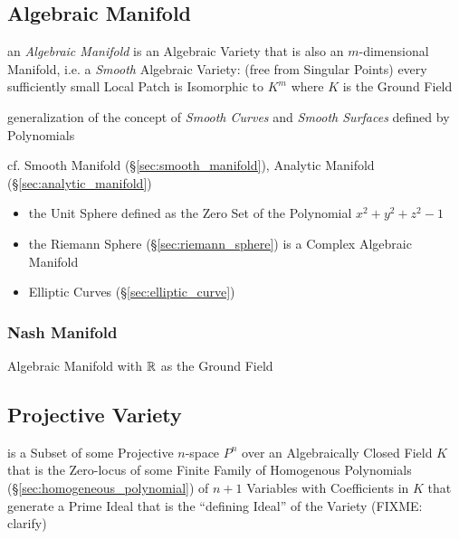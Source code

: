 \subsection{Algebraic Manifold}\label{sec:algebraic_manifold}

an \emph{Algebraic Manifold} is an Algebraic Variety that is also an
$m$-dimensional Manifold, i.e. a \emph{Smooth} Algebraic Variety:
(free from Singular Points) every sufficiently small Local Patch is Isomorphic
to $K^m$ where $K$ is the Ground Field

generalization of the concept of \emph{Smooth Curves} and \emph{Smooth
  Surfaces} defined by Polynomials

cf. Smooth Manifold (\S\ref{sec:smooth_manifold}), Analytic Manifold
(\S\ref{sec:analytic_manifold})

\begin{itemize}
  \item the Unit Sphere defined as the Zero Set of the Polynomial
    $x^2 + y^2 + z^2 - 1$
  \item the Riemann Sphere (\S\ref{sec:riemann_sphere}) is a Complex Algebraic
    Manifold
  \item Elliptic Curves (\S\ref{sec:elliptic_curve})
\end{itemize}



\subsubsection{Nash Manifold}\label{sec:nash_manifold}

Algebraic Manifold with $\mathbb{R}$ as the Ground Field



\subsection{Projective Variety}\label{sec:projective_variety}

is a Subset of some Projective $n$-space $\xspace{P}^n$ over an Algebraically
Closed Field $K$ that is the Zero-locus of some Finite Family of Homogenous
Polynomials (\S\ref{sec:homogeneous_polynomial}) of $n + 1$ Variables with
Coefficients in $K$ that generate a Prime Ideal that is the ``defining Ideal''
of the Variety (FIXME: clarify)




